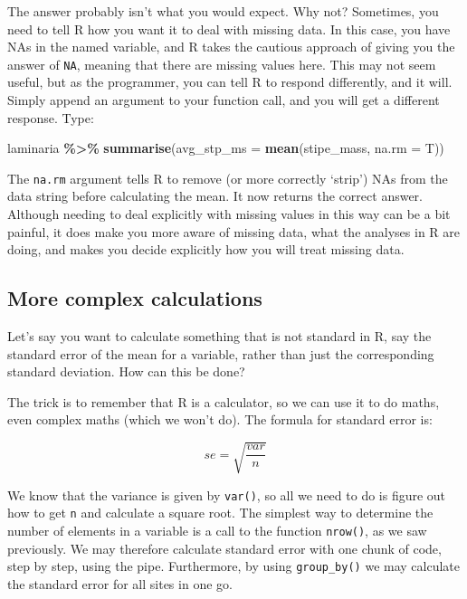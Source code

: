 \documentclass[
]{book}
\newenvironment{Shaded}{\begin{snugshade}}{\end{snugshade}}
\newcommand{\DataTypeTok}[1]{\textcolor[rgb]{0.13,0.29,0.53}{#1}}
\newcommand{\KeywordTok}[1]{\textcolor[rgb]{0.13,0.29,0.53}{\textbf{#1}}}
\newcommand{\NormalTok}[1]{#1}
\newcommand{\OperatorTok}[1]{\textcolor[rgb]{0.81,0.36,0.00}{\textbf{#1}}}
\newcommand{\StringTok}[1]{\textcolor[rgb]{0.31,0.60,0.02}{#1}}
\begin{document}
The answer probably isn't what you would expect. Why not? Sometimes, you need to tell R how you want it to deal with missing data. In this case, you have NAs in the named variable, and R takes the cautious approach of giving you the answer of \texttt{NA}, meaning that there are missing values here. This may not seem useful, but as the programmer, you can tell R to respond differently, and it will. Simply append an argument to your function call, and you will get a different response. Type:

\begin{Shaded}
\begin{Highlighting}[]
\NormalTok{laminaria }\OperatorTok{\%>\%}\StringTok{ }
\StringTok{  }\KeywordTok{summarise}\NormalTok{(}\DataTypeTok{avg\_stp\_ms =} \KeywordTok{mean}\NormalTok{(stipe\_mass, }\DataTypeTok{na.rm =}\NormalTok{ T))}
\end{Highlighting}
\end{Shaded}

The \texttt{na.rm} argument tells R to remove (or more correctly `strip') NAs from the data string before calculating the mean. It now returns the correct answer. Although needing to deal explicitly with missing values in this way can be a bit painful, it does make you more aware of missing data, what the analyses in R are doing, and makes you decide explicitly how you will treat missing data.

\hypertarget{more-complex-calculations}{%
\subsection{More complex calculations}\label{more-complex-calculations}}

Let's say you want to calculate something that is not standard in R, say the standard error of the mean for a variable, rather than just the corresponding standard deviation. How can this be done?

The trick is to remember that R is a calculator, so we can use it to do maths, even complex maths (which we won't do). The formula for standard error is:

\[se = \sqrt{\frac{var}{n}}\]

We know that the variance is given by \texttt{var()}, so all we need to do is figure out how to get \texttt{n} and calculate a square root. The simplest way to determine the number of elements in a variable is a call to the function \texttt{nrow()}, as we saw previously. We may therefore calculate standard error with one chunk of code, step by step, using the pipe. Furthermore, by using \texttt{group\_by()} we may calculate the standard error for all sites in one go.
\end{document}

